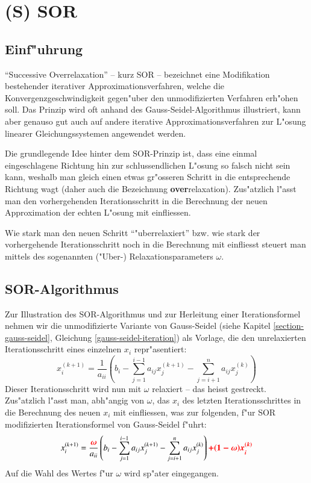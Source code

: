 \chapter{(S) SOR\label{chapter:sor}}
\begin{refsection}

\section{Einf"uhrung}
``Successive Overrelaxation'' -- kurz SOR -- bezeichnet eine
Modifikation bestehender iterativer Approximationsverfahren, welche
die Konvergenzgeschwindigkeit gegen"uber den unmodifizierten Verfahren
erh"ohen soll. Das Prinzip wird oft anhand des Gauss-Seidel-Algorithmus
illustriert, kann aber genauso gut auch auf andere iterative
Approximationsverfahren zur L"osung linearer Gleichungssystemen angewendet
werden.

Die grundlegende Idee hinter dem SOR-Prinzip ist, dass eine einmal
eingeschlagene Richtung hin zur schlussendlichen L"osung so falsch
nicht sein kann, weshalb man gleich einen etwas gr"osseren Schritt
in die entsprechende Richtung wagt (daher auch die Bezeichnung
\textbf{over}relaxation). Zus"atzlich l"asst man den vorhergehenden
Iterationsschritt in die Berechnung der neuen Approximation der echten
L"osung mit einfliessen.

Wie stark man den neuen Schritt ``"uberrelaxiert'' bzw. wie stark der
vorhergehende Iterationsschritt noch in die Berechnung mit einfliesst
steuert man mittels des sogenannten ("Uber-) Relaxationsparameters
$\omega$.
	
\section{SOR-Algorithmus\label{sec: SOR-Alg.}}
Zur Illustration des SOR-Algorithmus und zur Herleitung einer
Iterationsformel nehmen wir die unmodifizierte Variante von
Gauss-Seidel (siehe Kapitel \ref{section-gauss-seidel}, Gleichung
\ref{gauss-seidel-iteration}) als Vorlage, die den unrelaxierten
Iterationsschritt eines einzelnen $x_i$ repr"asentiert:
\begin{equation} \label{eq: G.-S.-It.formel}
	x_i^{(k+1)} = \frac{1}{a_{ii}}\left(b_i-\sum\limits_{j=1}^{i-1} a_{ij}x_j^{(k+1)}-\sum\limits_{j=i+1}^na_{ij}x_j^{(k)}\right)
\end{equation}
Dieser Iterationsschritt wird nun mit $\omega$ relaxiert -- das heisst
gestreckt. Zus"atzlich l"asst man, abh"angig von $\omega$, das $x_i$
des letzten Iterationsschrittes in die Berechnung des neuen $x_i$ mit
einfliessen, was zur folgenden, f"ur SOR modifizierten Iterationsformel
von Gauss-Seidel f"uhrt:
\begin{equation} \label{eq: SOR-It.formel1}
	x_i^{(k+1)} = \frac{\boldsymbol{\textcolor{red}{\omega}}}{a_{ii}}\left(b_i-\sum\limits_{j=1}^{i-1}a_{ij}x_j^{(k+1)}-\sum\limits_{j=i+1}^n a_{ij}x_j^{(k)}\right)\boldsymbol{\textcolor{red}{+(1-\omega)x_i^{(k)}}}
\end{equation}
Auf die Wahl des Wertes f"ur $\omega$ wird sp"ater eingegangen.
		

\end{refsection}
